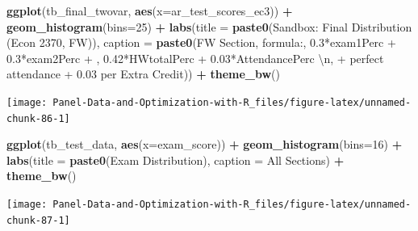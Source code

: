 \documentclass[
]{book}
\newenvironment{Shaded}{\begin{snugshade}}{\end{snugshade}}
\newcommand{\CharTok}[1]{\textcolor[rgb]{0.31,0.60,0.02}{#1}}
\newcommand{\DataTypeTok}[1]{\textcolor[rgb]{0.13,0.29,0.53}{#1}}
\newcommand{\DecValTok}[1]{\textcolor[rgb]{0.00,0.00,0.81}{#1}}
\newcommand{\KeywordTok}[1]{\textcolor[rgb]{0.13,0.29,0.53}{\textbf{#1}}}
\newcommand{\NormalTok}[1]{#1}
\newcommand{\OperatorTok}[1]{\textcolor[rgb]{0.81,0.36,0.00}{\textbf{#1}}}
\newcommand{\StringTok}[1]{\textcolor[rgb]{0.31,0.60,0.02}{#1}}
\begin{document}
\begin{Shaded}
\begin{Highlighting}[]
\KeywordTok{ggplot}\NormalTok{(tb\_final\_twovar, }\KeywordTok{aes}\NormalTok{(}\DataTypeTok{x=}\NormalTok{ar\_test\_scores\_ec3)) }\OperatorTok{+}
\StringTok{  }\KeywordTok{geom\_histogram}\NormalTok{(}\DataTypeTok{bins=}\DecValTok{25}\NormalTok{) }\OperatorTok{+}
\StringTok{  }\KeywordTok{labs}\NormalTok{(}\DataTypeTok{title =} \KeywordTok{paste0}\NormalTok{(}\StringTok{\textquotesingle{}Sandbox: Final Distribution (Econ 2370, FW)\textquotesingle{}}\NormalTok{),}
       \DataTypeTok{caption =} \KeywordTok{paste0}\NormalTok{(}\StringTok{\textquotesingle{}FW Section, formula:\textquotesingle{}}\NormalTok{,}
                        \StringTok{\textquotesingle{}0.3*exam1Perc + 0.3*exam2Perc + \textquotesingle{}}\NormalTok{,}
                        \StringTok{\textquotesingle{}0.42*HWtotalPerc + 0.03*AttendancePerc }\CharTok{\textbackslash{}n}\StringTok{\textquotesingle{}}\NormalTok{,}
                        \StringTok{\textquotesingle{}+ perfect attendance + 0.03 per Extra Credit\textquotesingle{}}\NormalTok{)) }\OperatorTok{+}
\StringTok{  }\KeywordTok{theme\_bw}\NormalTok{()}
\end{Highlighting}
\end{Shaded}

\begin{center}\texttt{[image: Panel-Data-and-Optimization-with-R\_files/figure-latex/unnamed-chunk-86-1]} \end{center}

\begin{Shaded}
\begin{Highlighting}[]
\KeywordTok{ggplot}\NormalTok{(tb\_test\_data, }\KeywordTok{aes}\NormalTok{(}\DataTypeTok{x=}\NormalTok{exam\_score)) }\OperatorTok{+}
\StringTok{  }\KeywordTok{geom\_histogram}\NormalTok{(}\DataTypeTok{bins=}\DecValTok{16}\NormalTok{) }\OperatorTok{+}
\StringTok{  }\KeywordTok{labs}\NormalTok{(}\DataTypeTok{title =} \KeywordTok{paste0}\NormalTok{(}\StringTok{\textquotesingle{}Exam Distribution\textquotesingle{}}\NormalTok{),}
       \DataTypeTok{caption =} \StringTok{\textquotesingle{}All Sections\textquotesingle{}}\NormalTok{) }\OperatorTok{+}
\StringTok{  }\KeywordTok{theme\_bw}\NormalTok{()}
\end{Highlighting}
\end{Shaded}

\begin{center}\texttt{[image: Panel-Data-and-Optimization-with-R\_files/figure-latex/unnamed-chunk-87-1]} \end{center}
\end{document}
